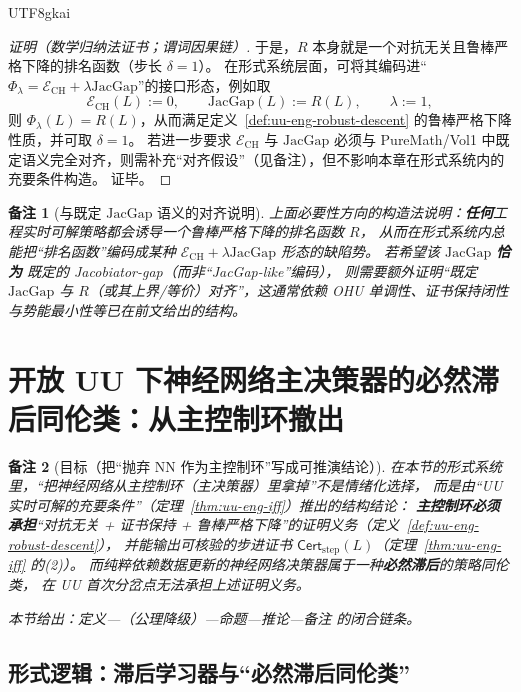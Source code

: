 \documentclass[12pt]{article}
\newtheorem{remark}{备注}[section]
\newcommand{\GFramework}{\text{G-Framework}}
\newcommand{\JacGap}{\ensuremath{\mathrm{JacGap}}} %
\begin{document}
\begin{CJK*}{UTF8}{gkai}
\begin{proof}[证明（数学归纳法证书；谓词因果链）]
于是，$R$ 本身就是一个对抗无关且鲁棒严格下降的排名函数（步长 $\delta=1$）。
在形式系统层面，可将其编码进“$\Phi_\lambda=\mathcal{E}_{\mathrm{CH}}+\lambda\JacGap$”的接口形态，例如取
\[
  \mathcal{E}_{\mathrm{CH}}(L):=0,\qquad \JacGap(L):=R(L),\qquad \lambda:=1,
\]
则 $\Phi_\lambda(L)=R(L)$，从而满足定义~\ref{def:uu-eng-robust-descent} 的鲁棒严格下降性质，并可取 $\delta=1$。
若进一步要求 $\mathcal{E}_{\mathrm{CH}}$ 与 $\JacGap$ 必须与 PureMath/Vol1 中既定语义完全对齐，则需补充“对齐假设”（见备注），但不影响本章在形式系统内的充要条件构造。
证毕。
\end{proof}

\begin{remark}[与既定 $\JacGap$ 语义的对齐说明]
上面必要性方向的构造法说明：\textbf{任何}工程实时可解策略都会诱导一个鲁棒严格下降的排名函数 $R$，
从而在形式系统内总能把“排名函数”编码成某种 $\mathcal{E}_{\mathrm{CH}}+\lambda\JacGap$ 形态的缺陷势。
若希望该 $\JacGap$ \textbf{恰为} \GFramework{} 既定的 Jacobiator-gap（而非“JacGap-like”编码），
则需要额外证明“既定 $\JacGap$ 与 $R$（或其上界/等价）对齐”，这通常依赖 OHU 单调性、证书保持闭性与势能最小性等已在前文给出的结构。
\end{remark}

\section{开放 UU 下神经网络主决策器的必然滞后同伦类：从主控制环撤出}
\label{sec:uu-nn-main-loop-removal}

\begin{remark}[目标（把“抛弃 NN 作为主控制环”写成可推演结论）]
在本节的形式系统里，“把神经网络从主控制环（主决策器）里拿掉”不是情绪化选择，
而是由“UU 实时可解的充要条件”（定理~\ref{thm:uu-eng-iff}）推出的结构结论：
\textbf{主控制环必须承担}“对抗无关 + 证书保持 + 鲁棒严格下降”的证明义务（定义~\ref{def:uu-eng-robust-descent}），
并能输出可核验的步进证书 $\mathsf{Cert}_{\mathrm{step}}(L)$（定理~\ref{thm:uu-eng-iff} 的(2)）。
而纯粹依赖数据更新的神经网络决策器属于一种\textbf{必然滞后}的策略同伦类，
在 UU 首次分岔点无法承担上述证明义务。

本节给出：定义—（公理降级）—命题—推论—备注 的闭合链条。
\end{remark}

\subsection{形式逻辑：滞后学习器与“必然滞后同伦类”}
\label{sec:nn-lag-class}


\end{CJK*}
\end{document}
